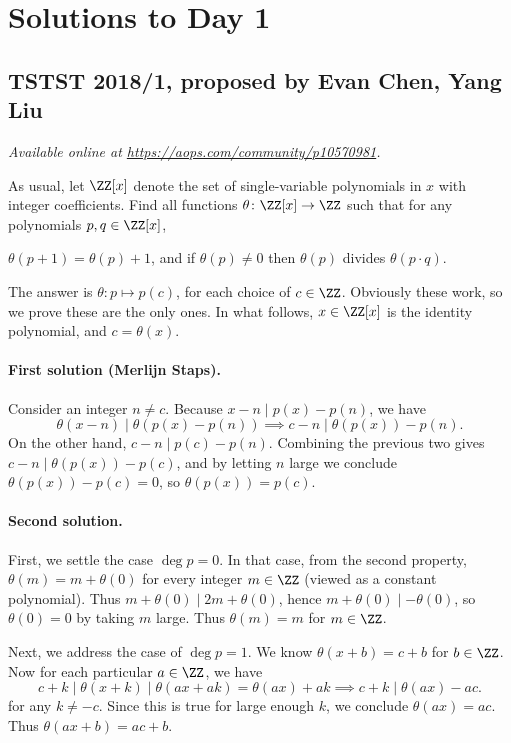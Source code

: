 \documentclass[11pt]{scrartcl}
\begin{document}
\section{Solutions to Day 1}
\subsection{TSTST 2018/1, proposed by Evan Chen, Yang Liu}
\textsl{Available online at \url{https://aops.com/community/p10570981}.}
\begin{mdframed}[style=mdpurplebox,frametitle={Problem statement}]
As usual, let $\ZZ[x]$ denote the set of single-variable
polynomials in $x$ with integer coefficients.
Find all functions $\theta \colon \ZZ[x] \to \ZZ$
such that for any polynomials $p,q \in \ZZ[x]$,
\begin{itemize}
  \ii $\theta(p+1) = \theta(p)+1$, and
  \ii if $\theta(p) \neq 0$
  then $\theta(p)$ divides $\theta(p \cdot q)$.
\end{itemize}
\end{mdframed}
The answer is $\theta : p \mapsto p(c)$, for each choice of $c \in \ZZ$.
Obviously these work, so we prove these are the only ones.
In what follows, $x \in \ZZ[x]$ is the identity polynomial,
and $c = \theta(x)$.

\paragraph{First solution (Merlijn Staps).}
Consider an integer $n \neq c$.
Because $x-n \mid p(x)-p(n)$, we have
\[ \theta(x-n) \mid \theta(p(x)-p(n))
  \implies c - n \mid \theta(p(x)) - p(n).
\]
On the other hand, $c - n \mid p(c) - p(n)$.
Combining the previous two gives $c - n \mid \theta(p(x)) - p(c)$,
and by letting $n$ large we conclude
$\theta(p(x)) - p(c) = 0$, so $\theta(p(x)) = p(c)$.

\paragraph{Second solution.}
First, we settle the case $\deg p = 0$.
In that case, from the second property,
$\theta(m) = m + \theta(0)$ for every integer $m \in \ZZ$
(viewed as a constant polynomial).
Thus $m + \theta(0) \mid 2m + \theta(0)$,
hence $m + \theta(0) \mid -\theta(0)$,
so $\theta(0) = 0$ by taking $m$ large.
Thus $\theta(m) = m$ for $m \in \ZZ$.

Next, we address the case of $\deg p = 1$.
We know $\theta(x+b) = c+b$ for $b \in \ZZ$.
Now for each particular $a \in \ZZ$,
we have
\[ c+k \mid \theta(x+k) \mid \theta(ax+ak) = \theta(ax) + ak
  \implies c+k \mid \theta(ax) - ac. \]
for any $k \neq -c$.
Since this is true for large enough $k$,
we conclude $\theta(ax) = ac$.
Thus $\theta(ax+b) = ac+b$.
\end{document}
